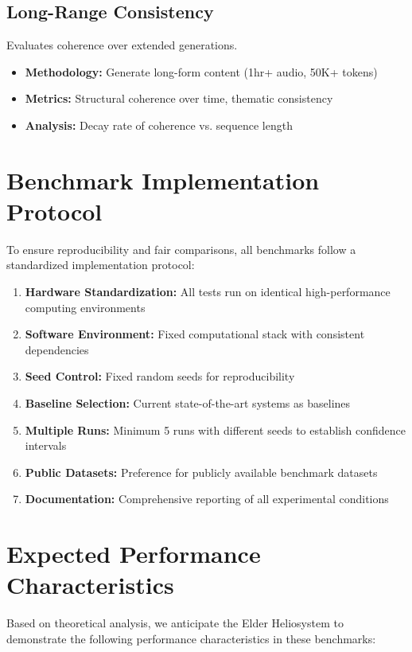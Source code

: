 \subsection{Long-Range Consistency}

Evaluates coherence over extended generations.

\begin{itemize}
    \item \textbf{Methodology:} Generate long-form content (1hr+ audio, 50K+ tokens)
    \item \textbf{Metrics:} Structural coherence over time, thematic consistency
    \item \textbf{Analysis:} Decay rate of coherence vs. sequence length
\end{itemize}

\section{Benchmark Implementation Protocol}

To ensure reproducibility and fair comparisons, all benchmarks follow a standardized implementation protocol:

\begin{enumerate}
    \item \textbf{Hardware Standardization:} All tests run on identical high-performance computing environments
    \item \textbf{Software Environment:} Fixed computational stack with consistent dependencies
    \item \textbf{Seed Control:} Fixed random seeds for reproducibility
    \item \textbf{Baseline Selection:} Current state-of-the-art systems as baselines
    \item \textbf{Multiple Runs:} Minimum 5 runs with different seeds to establish confidence intervals
    \item \textbf{Public Datasets:} Preference for publicly available benchmark datasets
    \item \textbf{Documentation:} Comprehensive reporting of all experimental conditions
\end{enumerate}

\section{Expected Performance Characteristics}

Based on theoretical analysis, we anticipate the Elder Heliosystem to demonstrate the following performance characteristics in these benchmarks:

